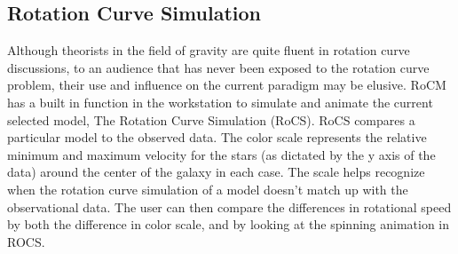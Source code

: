\documentclass[conference]{IEEEtran-modified}
\providecommand{\e}[1]{\ensuremath{\times 10^{#1}}}
\begin{document}
%


\subsection{Rotation Curve Simulation}

Although theorists in the field of gravity are quite fluent in rotation curve discussions, to an audience that has never been exposed to the rotation curve problem, their use and influence on the current paradigm may be elusive. RoCM has a built in function in the workstation to simulate and animate the current selected model, The Rotation Curve Simulation (RoCS). RoCS compares a particular model to the observed data. The color scale represents the relative {\color[HTML]{EA051C} minimum} and {\color[HTML]{1AAF3A} maximum} velocity for the stars (as dictated by the  y axis of the data) around the center of the galaxy in each case. The scale helps recognize when the rotation curve simulation of a model doesn't match up with the observational data.  The user can then compare the differences in rotational speed by both the difference in color scale, and by looking at the spinning animation in ROCS.
\end{document}
